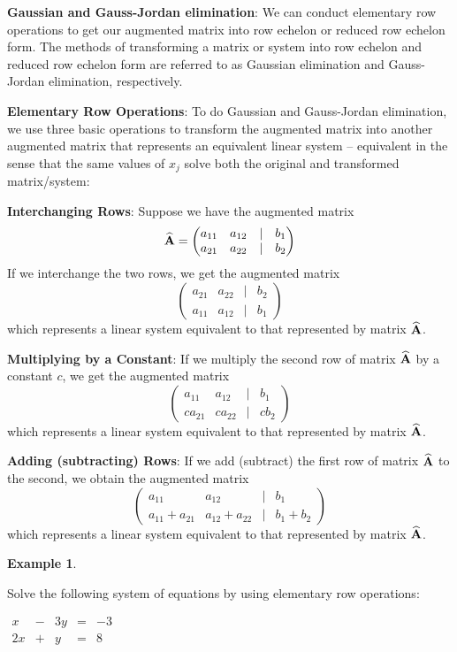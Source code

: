 \documentclass[
]{book}
\theoremstyle{definition}
\theoremstyle{definition}
\newtheorem{example}{Example}[chapter]
\theoremstyle{definition}
\theoremstyle{remark}
\begin{document}
\textbf{Gaussian and Gauss-Jordan elimination}: We can conduct elementary row operations to get our augmented matrix into row echelon or reduced row echelon form. The methods of transforming a matrix or system into row echelon and reduced row echelon form are referred to as Gaussian elimination and Gauss-Jordan elimination, respectively.

\textbf{Elementary Row Operations}: To do Gaussian and Gauss-Jordan elimination, we use three basic operations to transform the augmented matrix into another augmented matrix that represents an equivalent linear system -- equivalent in the sense that the same values of \(x_j\) solve both the original and transformed matrix/system:

\textbf{Interchanging Rows}: Suppose we have the augmented matrix
\[{\widehat{\bf A}}=\begin{pmatrix} a_{11} & a_{12} & | & b_1\\
            a_{21} & a_{22} & | & b_2 
            \end{pmatrix}\]
If we interchange the two rows, we get the augmented matrix
\[\begin{pmatrix}
            a_{21} & a_{22} & | & b_2\\
            a_{11} & a_{12} & | & b_1
            \end{pmatrix}\]
which represents a linear system equivalent to that represented by matrix \(\widehat{\bf A}\).

\textbf{Multiplying by a Constant}: If we multiply the second row of matrix \(\widehat{\bf A}\) by a constant \(c\), we get the augmented matrix
\[\begin{pmatrix}
            a_{11} & a_{12} & | & b_1\\
            c a_{21} & c a_{22} & | & c b_2
            \end{pmatrix}\]
which represents a linear system equivalent to that represented by matrix \(\widehat{\bf A}\).

\textbf{Adding (subtracting) Rows}: If we add (subtract) the first row of matrix \(\widehat{\bf A}\) to the second, we obtain the augmented matrix
\[\begin{pmatrix}
            a_{11} & a_{12} & | & b_1\\
            a_{11}+a_{21} & a_{12}+a_{22} & | & b_1+b_2
            \end{pmatrix}\]
which represents a linear system equivalent to that represented by matrix \(\widehat{\bf A}\).

\begin{example}
\protect\hypertarget{exm:solvesys}{}{\label{exm:solvesys} }

Solve the following system of equations by using elementary row operations:

\(\begin{matrix}  x & - & 3y & = & -3\\  2x & + & y & = & 8  \end{matrix}\)
\end{example}
\end{document}

